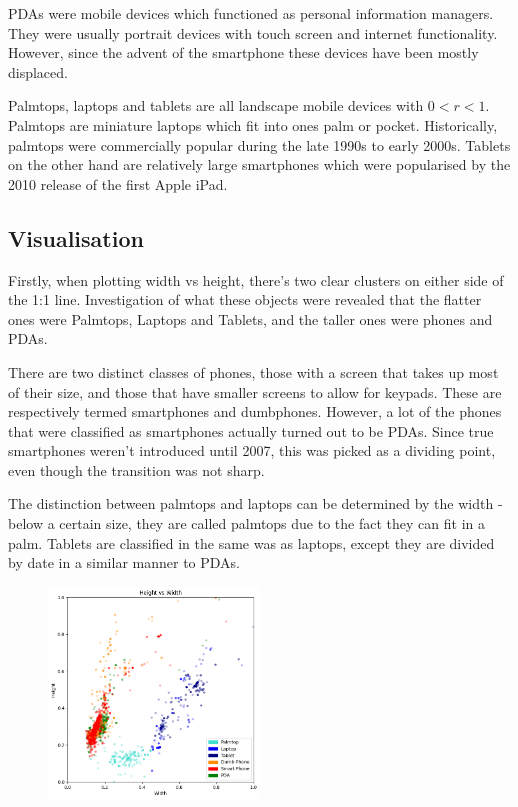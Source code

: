 \documentclass[conference]{IEEEtran}
\begin{document}
PDAs were mobile devices which functioned as personal information managers. They
were usually portrait devices with touch screen and internet functionality.
However, since the advent of the smartphone these devices have been mostly
displaced.

Palmtops, laptops and tablets are all landscape mobile devices with $0<r<1$.
Palmtops are miniature laptops which fit into ones palm or pocket. Historically,
palmtops were commercially popular during the late 1990s to early 2000s.
Tablets on the other hand are relatively large smartphones which were
popularised by the 2010 release of the first Apple iPad.
\subsection{Visualisation} \label{sec:Avisu}

Firstly, when plotting width vs height, there's two clear clusters on either side of the 1:1 line. Investigation of what these objects were revealed that the flatter ones were Palmtops, Laptops and Tablets, and the taller ones were phones and PDAs.

There are two distinct classes of phones, those with a screen that takes up most of their size, and those that have smaller screens to allow for keypads. These are respectively termed smartphones and dumbphones. However, a lot of the phones that were classified as smartphones actually turned out to be PDAs. Since true smartphones weren't introduced until 2007, this was picked as a dividing point, even though the transition was not sharp.

The distinction between palmtops and laptops can be determined by the width - below a certain size, they are called palmtops due to the fact they can fit in a palm. Tablets are classified in the same was as laptops, except they are divided by date in a similar manner to PDAs.

\begin{figure}
    \centering
    \includegraphics[width=0.5\textwidth]{Visualisations/A/HeightvsWidthColour.png}
    \caption{}
    \label{fig:HeightvsWidth}
\end{figure}
\end{document}
